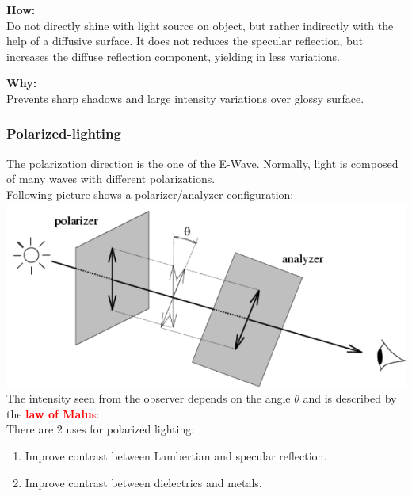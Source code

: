 \documentclass[a4paper, fontsize=8pt, landscape, DIV=1]{scrartcl}
\begin{document}
\begin{multicols*}{4}
		\textbf{How:}\\
		Do not directly shine with light source on object, but rather indirectly with the help of a diffusive surface. It does not reduces the specular reflection, but increases the diffuse reflection component, yielding in less variations.
		\par 
		\textbf{Why:}\\
		Prevents sharp shadows and large intensity variations over glossy surface.  
	
		\subsubsection{Polarized-lighting}
		The polarization direction is the one of the E-Wave. Normally, light is composed of many waves with different polarizations. \\
		Following picture shows a polarizer/analyzer configuration:\\
		\includegraphics[width=\columnwidth]{images//ImageAcq/polarizer_analyzer.png}
		The intensity seen from the observer depends on the angle $\theta$ and is described by the \textcolor{red}{\textbf{law of Malu}s}:\\
		There are 2 uses for polarized lighting:
		\begin{enumerate}[noitemsep]
			\item Improve contrast between Lambertian and specular reflection.
			\item Improve contrast between dielectrics and metals.
		\end{enumerate}
		\vfill\null
		\columnbreak
		

\end{multicols*}
\end{document}

